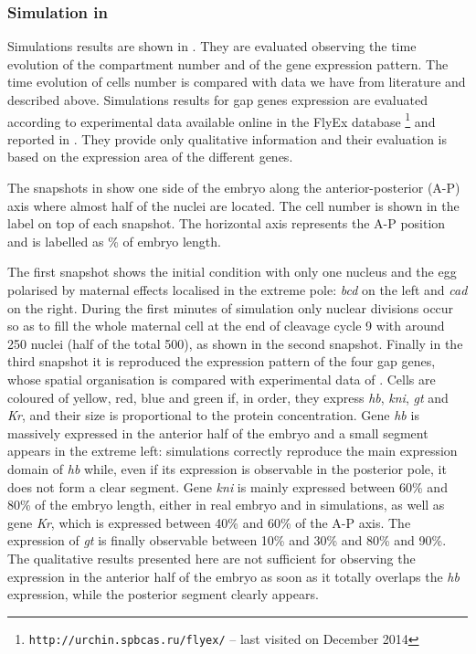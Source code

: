 \documentclass[12pt,a4paper,twoside,openright]{book}
\begin{document}
\subsubsection{Simulation in \alchemist{}}

Simulations results are shown in . They are evaluated observing the time evolution of the compartment number and of the gene expression pattern. 
%
The time evolution of cells number is compared with data we have from literature and described above.
%
Simulations results for gap genes expression are evaluated according to experimental data available online in the FlyEx database \cite{database-2008}\footnote{\texttt{http://urchin.spbcas.ru/flyex/} -- last visited on December 2014} and reported in . They provide only qualitative information and their evaluation is  based on the expression area of the different genes.

The snapshots  in  show one side of the embryo along the anterior-posterior (A-P) axis where almost half of the nuclei are located. The cell number is shown in the label on top of each snapshot. The horizontal axis represents the A-P position and  is labelled as \% of embryo length.

The first snapshot shows the initial condition with only one nucleus and the egg polarised by maternal effects localised in the extreme pole: \emph{bcd} on the left and \emph{cad} on the right.
%
During the first minutes of simulation only nuclear divisions occur so as to fill the whole maternal cell at the end of cleavage cycle 9 with around 250 nuclei (half of the total 500), as shown in the second snapshot. 
%
Finally in the third snapshot it is reproduced the expression pattern of the four gap genes, whose spatial organisation is compared with experimental data of . Cells are coloured  of yellow, red, blue and green if, in order, they express \emph{hb}, \emph{kni}, \emph{gt} and \emph{Kr}, and their size is proportional to the protein concentration.
%
Gene \emph{hb} is massively expressed in the anterior half of the embryo and a small segment appears in the extreme left: simulations correctly reproduce the main expression domain of \emph{hb} while, even if its expression is observable in the posterior pole, it does not form a clear segment.
%
Gene  \emph{kni} is mainly expressed between 60\% and 80\% of the embryo length, either in real embryo and in simulations,
%
as well as gene  \emph{Kr}, which is expressed between 40\% and 60\% of the A-P axis.
%
The expression of  \emph{gt} is finally observable between 10\% and 30\% and 80\% and 90\%. The qualitative results presented here are not sufficient for observing the expression in the anterior half of the embryo as soon as it totally overlaps the \emph{hb} expression, while the posterior segment clearly appears.
%
\end{document}
